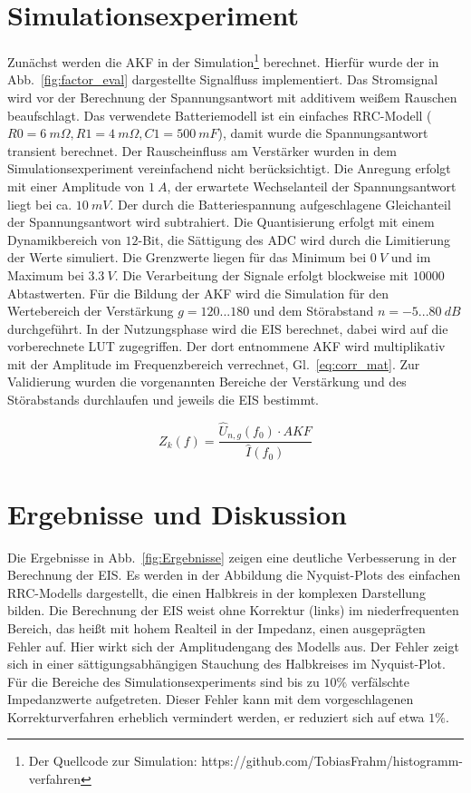 \smallskip
\section{Simulationsexperiment}
Zunächst werden die AKF in der Simulation\footnote[2]{Der Quellcode zur Simulation: https://github.com/TobiasFrahm/histogramm-verfahren} berechnet. Hierfür wurde der in Abb.~\ref{fig:factor_eval} dargestellte Signalfluss implementiert. Das Stromsignal wird vor der Berechnung der Spannungsantwort mit additivem weißem Rauschen beaufschlagt. Das verwendete Batteriemodell ist ein einfaches RRC-Modell ($R0 = \SI{6}{m\Omega}, R1=\SI{4}{m\Omega}, C1=\SI{500}{mF}$), damit wurde die Spannungsantwort transient berechnet. Der Rauscheinfluss am Verstärker wurden in dem Simulationsexperiment vereinfachend nicht berücksichtigt. Die Anregung erfolgt mit einer Amplitude von $\SI{1}{A}$, der erwartete Wechselanteil der Spannungsantwort liegt bei ca. $\SI{10}{mV}$. Der durch die Batteriespannung aufgeschlagene Gleichanteil der Spannungsantwort wird subtrahiert. Die Quantisierung erfolgt mit einem Dynamikbereich von $12$-Bit, die Sättigung des ADC wird durch die Limitierung der Werte simuliert. Die Grenzwerte liegen für das Minimum bei $\SI{0}{V}$ und im Maximum bei $\SI{3.3}{V}$. Die Verarbeitung der Signale erfolgt blockweise mit $10000$ Abtastwerten. Für die Bildung der AKF wird die Simulation für den Wertebereich der Verstärkung $g = 120 ... 180$ und dem Störabstand $n = -5 ... \SI{80}{dB}$ durchgeführt. In der Nutzungsphase wird die EIS berechnet, dabei wird auf die vorberechnete LUT zugegriffen. Der dort entnommene AKF wird multiplikativ mit der Amplitude im Frequenzbereich verrechnet, Gl.~\eqref{eq:corr_mat}. Zur Validierung wurden die vorgenannten Bereiche der Verstärkung und des Störabstands durchlaufen und jeweils die EIS bestimmt.

\begin{equation}
	\label{eq:corr_mat}
	Z_k(f) = \frac{\hat{U}_{n,g}(f_0) \cdot AKF}{\hat{I}(f_0)}
\end{equation}	


\section{Ergebnisse und Diskussion}
Die Ergebnisse in Abb.~\ref{fig:Ergebnisse} zeigen eine deutliche Verbesserung in der Berechnung der EIS. Es werden in der Abbildung die Nyquist-Plots des einfachen RRC-Modells dargestellt, die einen Halbkreis in der komplexen Darstellung bilden. 
Die Berechnung der EIS weist ohne Korrektur (links) im niederfrequenten Bereich, das heißt mit hohem Realteil in der Impedanz, einen ausgeprägten Fehler auf. Hier wirkt sich der Amplitudengang des Modells aus. Der Fehler zeigt sich in einer sättigungsabhängigen Stauchung des Halbkreises im Nyquist-Plot. Für die Bereiche des Simulationsexperiments sind bis zu $10\%$ verfälschte Impedanzwerte aufgetreten. Dieser Fehler kann mit dem vorgeschlagenen Korrekturverfahren erheblich vermindert werden, er reduziert sich auf etwa $1\%$. 

